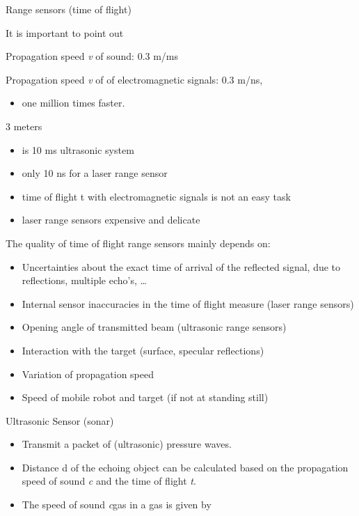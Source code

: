 \documentclass[compress]{beamer}
\providecommand{\tightlist}{%
  \setlength{\itemsep}{0pt}\setlength{\parskip}{0pt}}
\begin{document}
\begin{frame}{Range sensors (time of flight)}

It is important to point out

Propagation speed \emph{v} of sound: 0.3 m/ms

Propagation speed \emph{v} of of electromagnetic signals: 0.3 m/ns,

\begin{itemize}
\tightlist
\item
  one million times faster.
\end{itemize}

3 meters

\begin{itemize}
\tightlist
\item
  is 10 ms ultrasonic system
\item
  only 10 ns for a laser range sensor
\item
  time of flight t with electromagnetic signals is not an easy task
\item
  laser range sensors expensive and delicate
\end{itemize}

The quality of time of flight range sensors mainly depends on:

\begin{itemize}
\tightlist
\item
  Uncertainties about the exact time of arrival of the reflected signal,
  due to reflections, multiple echo's, \ldots{}
\item
  Internal sensor inaccuracies in the time of flight measure (laser
  range sensors)
\item
  Opening angle of transmitted beam (ultrasonic range sensors)
\item
  Interaction with the target (surface, specular reflections)
\item
  Variation of propagation speed
\item
  Speed of mobile robot and target (if not at standing still)
\end{itemize}

\end{frame}

\begin{frame}{Ultrasonic Sensor (sonar)}

\begin{itemize}
\tightlist
\item
  Transmit a packet of (ultrasonic) pressure waves.
\item
  Distance d of the echoing object can be calculated based on the
  propagation speed of sound \emph{c} and the time of flight \emph{t}.
\item
  The speed of sound \emph{c}gas in a gas is given by
\end{itemize}

\end{frame}
\end{document}

